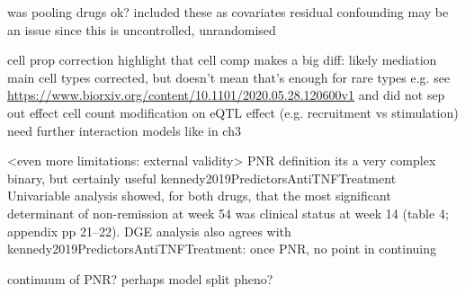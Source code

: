 \begin{outline}
    \2 was pooling drugs ok?
        \3 included these as covariates
        \3 residual confounding may be an issue since this is uncontrolled, unrandomised

    \2 cell prop correction
        \3 highlight that cell comp makes a big diff: likely mediation
         main cell types corrected, but doesn't mean that's enough for rare types e.g. see \url{https://www.biorxiv.org/content/10.1101/2020.05.28.120600v1} 
        \3 and did not sep out effect cell count modification on eQTL effect (e.g. recruitment vs stimulation)
        \3 need further interaction models like in ch3

\1 <even more limitations: external validity>
    \2 PNR definition
        \3 its a very complex binary, but certainly useful
        \3 kennedy2019PredictorsAntiTNFTreatment Univariable analysis showed, for both drugs, that the most significant determinant of non-remission at week 54 was clinical status at week 14 (table 4; appendix pp 21–22).
        \3 DGE analysis also agrees with kennedy2019PredictorsAntiTNFTreatment: once PNR, no point in continuing

        \3 continuum of PNR? perhaps model split pheno?


\end{outline}
